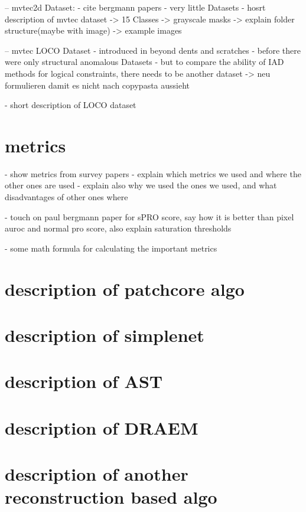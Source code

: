 -- mvtec2d Dataset:
- cite bergmann papers
- very little Datasets
- hosrt description of mvtec dataset 
-> 15 Classes
-> grayscale masks
-> explain folder structure(maybe with image)
-> example images

-- mvtec LOCO Dataset
- introduced in beyond dents and scratches
- before there were only structural anomalous Datasets
- but to compare the ability of IAD methods for logical constraints, there needs to be another dataset -> neu formulieren damit es nicht nach copypasta aussieht

- short description of LOCO dataset



\section{metrics}

- show metrics from survey papers
- explain which metrics we used and where the other ones are used
- explain also why we used the ones we used, and what disadvantages of other ones where

- touch on paul bergmann paper for sPRO score, say how it is better than pixel auroc and normal pro score, also explain saturation thresholds

- some math formula for calculating the important metrics





\section{description of patchcore algo}


\section{description of simplenet}

\section{description of AST}

\section{description of DRAEM}

\section{description of another reconstruction based algo}
















